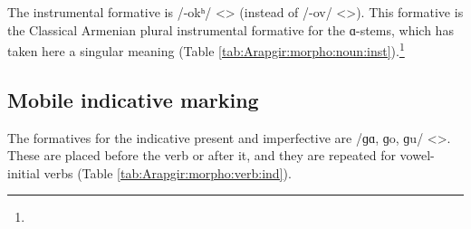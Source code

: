 The instrumental formative is /-okʰ/ <> (instead of /-ov/ <>). This formative is the Classical Armenian plural instrumental formative for the ɑ-stems, which has taken here a singular meaning (Table \ref{tab:Arapgir:morpho:noun:inst}).\footnote{}


\begin{table}[H] \centering
	\caption{Instrumental marking in the Arapgir dialect}
	\label{tab:Arapgir:morpho:noun:inst}
\end{table}

\subsection{Mobile indicative marking}


The formatives for the indicative present and   imperfective are /ɡɑ, ɡo, ɡu/ <>. These are placed before the verb or after it, and they are repeated for vowel-initial verbs (Table \ref{tab:Arapgir:morpho:verb:ind}).


